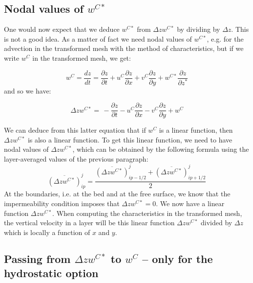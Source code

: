 


\subsection{Nodal values of $w^{C\ast}$}

One would now expect that we deduce $w^{C\ast}$ from $\Delta zw^{C\ast}$ by
dividing by $\Delta z$. This is not a good idea. As a matter of fact we need
nodal values of $w^{C\ast}$, e.g. for the advection in the transformed mesh
with the method of characteristics, but if we write $w^C$ in the transformed
mesh, we get:%

\begin{equation}
w^C=\dfrac{dz}{dt}=\dfrac{\partial z}{\partial t}+u^C\dfrac{\partial z}{\partial
x}+v^C\dfrac{\partial z}{\partial y}+w^{C\ast}\dfrac{\partial z}{\partial z^{\ast}}%
\end{equation}
and so we have:%

\begin{equation}
\Delta zw^{C\ast}=\,-\dfrac{\partial z}{\partial t}-u^C\dfrac{\partial z}{\partial
x}-v^C\dfrac{\partial z}{\partial y}+w^C \label{Wintransformedmesh}%
\end{equation}

We can deduce from this latter equation that if $w^C$ is a linear function, then
$\Delta zw^{C\ast}$ is also a linear function. To get this linear function, we
need to have nodal values of $\Delta zw^{C\ast}$, which can be obtained by the
following formula using the layer-averaged values of the previous paragraph:%
\begin{equation}
\overline{\left(  \Delta zw^{C\ast}\right)  }_{ip}^{j}=\dfrac{\overline{\left(
\Delta zw^{C\ast}\right)  }_{ip-1/2}^{j}+\overline{\left(\Delta
zw^{C\ast}\right)}_{ip+1/2}^{j}}{2}%
\end{equation}
At the boundaries, i.e. at the bed and at the free surface, we know that
the impermeability condition imposes that $\Delta zw^{C\ast}=0$. We now have a
linear function $\Delta zw^{C\ast}$. When computing the characteristics in the
transformed mesh, the vertical velocity in a layer will be this linear
function $\Delta zw^{C\ast}$ divided by $\Delta z$ which is locally a function
of $x$ and $y$.

\subsection{\label{wwstar}Passing from $\Delta zw^{C\ast}$ to $w^C$ -- only for the hydrostatic option}

